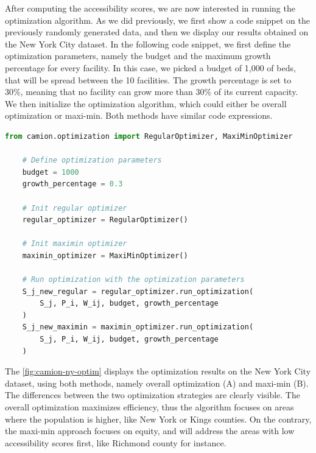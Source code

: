 After computing the accessibility scores, we are now interested in running
the optimization algorithm. As we did previously, we first show a code snippet
on the previously randomly generated data, and then we display our results
obtained on the New York City dataset. In the following code snippet, we
first define the optimization parameters, namely the budget and the
maximum growth percentage for every facility. In this case, we picked a budget
of 1,000 of beds, that will be spread between the 10 facilities. The growth
percentage is set to 30\%, meaning that no facility can grow more than 30\% of
its current capacity. We then initialize the optimization algorithm, which could
either be overall optimization or maxi-min. Both methods have similar code
expressions.

\begin{minipage}{\textwidth}
    \begin{lstlisting}[language=Python, caption=Optimize accessibility with \ac{camion}]
    from camion.optimization import RegularOptimizer, MaxiMinOptimizer

    # Define optimization parameters
    budget = 1000
    growth_percentage = 0.3

    # Init regular optimizer
    regular_optimizer = RegularOptimizer()

    # Init maximin optimizer
    maximin_optimizer = MaxiMinOptimizer()

    # Run optimization with the optimization parameters
    S_j_new_regular = regular_optimizer.run_optimization(
        S_j, P_i, W_ij, budget, growth_percentage
    )
    S_j_new_maximin = maximin_optimizer.run_optimization(
        S_j, P_i, W_ij, budget, growth_percentage
    )
    \end{lstlisting}
\end{minipage}

The \cref{fig:camion-ny-optim} displays the optimization results on
the New York City dataset, using both methods, namely overall optimization (A)
and maxi-min (B). The differences between the two optimization strategies are
clearly visible. The overall optimization maximizes efficiency, thus the
algorithm focuses on areas where the population is higher, like New York or
Kings counties. On the contrary, the maxi-min approach focuses on equity,
and will address the areas with low accessibility scores first, like Richmond
county for instance.

